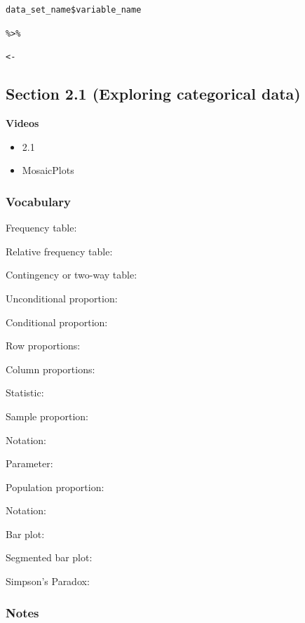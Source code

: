 \documentclass[
]{report}
\providecommand{\tightlist}{%
  \setlength{\itemsep}{0pt}\setlength{\parskip}{0pt}}
\newcommand{\rgs}{\vspace{12pt}} %
\newcommand{\rgi}{\hspace{24pt}}  %
\begin{document}
\texttt{data\_set\_name\$variable\_name}

\texttt{\%\textgreater{}\%}

\texttt{\textless{}-}

\hypertarget{section-2.1-exploring-categorical-data}{%
\subsection*{Section 2.1 (Exploring categorical data)}\label{section-2.1-exploring-categorical-data}}


\textbf{Videos}

\begin{itemize}
\tightlist
\item
  2.1
\item
  MosaicPlots
\end{itemize}


\hypertarget{vocabulary-3}{%
\subsubsection*{Vocabulary}\label{vocabulary-3}}

Frequency table:
\rgs

Relative frequency table:
\rgs

Contingency or two-way table:
\rgs

Unconditional proportion:
\rgs

Conditional proportion:
\rgs

\rgi Row proportions:
\rgs

\rgi Column proportions:
\rgs

Statistic:
\rgs

\rgi Sample proportion:
\rgs

\rgi \rgi Notation:
\rgs

Parameter:
\rgs

\rgi Population proportion:
\rgs

\rgi \rgi Notation:
\rgs

Bar plot:
\rgs

Segmented bar plot:
\rgs

Simpson's Paradox:
\rgs

\hypertarget{notes-4}{%
\subsubsection*{Notes}\label{notes-4}}
\end{document}

